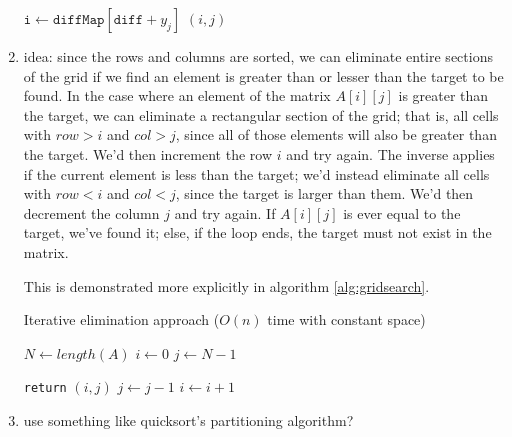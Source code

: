 \documentclass[12pt]{article}
\begin{document}
\begin{enumerate}
\begin{algorithm}
\begin{algorithmic}
                    \State $\texttt{i} \gets \texttt{diffMap}[\texttt{diff} + y_j]$
                    \State \Return $(i, j)$
                \EndIf
            \EndFor
        \end{algorithmic}
    \end{algorithm}

    \item idea: since the rows and columns are sorted, we can eliminate entire sections of the grid if we find an element 
    is greater than or lesser than the target to be found. In the case where an element of the matrix $A[i][j]$ is greater 
    than the target, we can eliminate a rectangular section of the grid; that is, all cells with $row > i$ and $col > j$, since 
    all of those elements will also be greater than the target. We'd then increment the row $i$ and try again. The inverse 
    applies if the current element is less than the target; we'd instead eliminate all cells with $row < i$ and $col < j$, 
    since the target is larger than them. We'd then decrement the column $j$ and try again. If $A[i][j]$ is ever equal to 
    the target, we've found it; else, if the loop ends, the target must not exist in the matrix.
    
    This is demonstrated more explicitly in algorithm \ref{alg:gridsearch}.
    
    \begin{algorithm}
        \caption{Iterative elimination approach ($O(n)$ time with constant space)}\label{alg:gridsearch}
        \begin{algorithmic}
            \State $N \gets length(A)$
            \State $i \gets 0$
            \State $j \gets N - 1$
            
                    \State \texttt{return} $(i, j)$
                \Else
                        \State $j \gets j - 1$
                    \Else
                        \State $i \gets i + 1$
                    \EndIf
                \EndIf
            \EndWhile
        \end{algorithmic}
    \end{algorithm}
    
    \item use something like quicksort's partitioning algorithm?
    

\end{enumerate}
\end{document}
